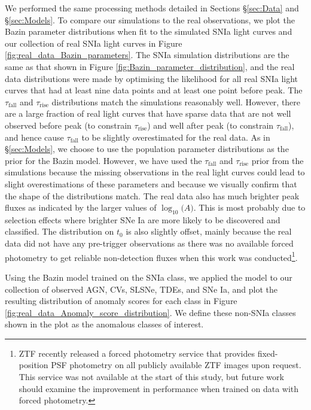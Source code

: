 \documentclass[fleqn,usenatbib]{mnras}
\begin{document}
We performed the same processing methods detailed in Sections \S\ref{sec:Data} and \S\ref{sec:Models}. To compare our simulations to the real observations, we plot the Bazin parameter distributions when fit to the simulated SNIa light curves and our collection of real SNIa light curves in Figure \ref{fig:real_data_Bazin_parameters}. The SNIa simulation distributions are the same as that shown in Figure \ref{fig:Bazin_parameter_distribution}, and the real data distributions were made by optimising the likelihood for all real SNIa light curves that had at least nine data points and at least one point before peak. The $\tau_{\mathrm{fall}}$ and $\tau_{\mathrm{rise}}$ distributions match the simulations reasonably well. However, there are a large fraction of real light curves that have sparse data that are not well observed before peak (to constrain $\tau_{\mathrm{rise}}$) and well after peak (to constrain $\tau_{\mathrm{fall}}$), and hence cause $\tau_{\mathrm{fall}}$ to be slightly overestimated for the real data. As in \S\ref{sec:Models}, we choose to use the population parameter distributions as the prior for the Bazin model. However, we have used the $\tau_{\mathrm{fall}}$ and $\tau_{\mathrm{rise}}$ prior from the simulations because the missing observations in the real light curves could lead to slight overestimations of these parameters and because we visually confirm that the shape of the distributions match. The real data also has much brighter peak fluxes as indicated by the larger values of $\log_{10}{(A})$. This is most probably due to selection effects where brighter SNe Ia are more likely to be discovered and classified. The distribution on $t_0$ is also slightly offset, mainly because the real data did not have any pre-trigger observations as there was no available forced photometry to get reliable non-detection fluxes when this work was conducted\footnote{ZTF recently released a forced photometry service that provides fixed-position PSF photometry on all publicly available ZTF images upon request. This service was not available at the start of this study, but future work should examine the improvement in performance when trained on data with forced photometry.}. 

Using the Bazin model trained on the SNIa class, we applied the model to our collection of observed AGN, CVs, SLSNe, TDEs, and SNe Ia, and plot the resulting distribution of anomaly scores for each class in Figure \ref{fig:real_data_Anomaly_score_distribution}. We define these non-SNIa classes shown in the plot as the anomalous classes of interest.
\end{document}
